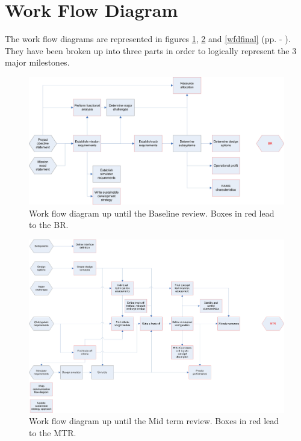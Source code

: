 \section{Work Flow Diagram}
\label{dsePPWFD}
The work flow diagrams are represented in figures \ref{wfdbase}, \ref{wfdmid} and \ref{wfdfinal} (pp. \pageref{wfdbase} - \pageref{wfdfinal}). They have been broken up into three parts in order to logically represent the 3 major milestones.

\begin{figure}[H]
\begin{center}
\includegraphics[width=1.2\textwidth, angle=90]{chapters/img/Workflow_diagram_BR.jpg}
\end{center}
\caption{Work flow diagram up until the Baseline review. Boxes in red lead to the BR.}
\label{wfdbase}
\end{figure}

\begin{figure}[H]
\begin{center}
\includegraphics[width=1.2\textwidth, angle=90]{chapters/img/Workflow_diagram_MTR.jpg}
\end{center}
\caption{Work flow diagram up until the Mid term review. Boxes in red lead to the MTR.}
\label{wfdmid}
\end{figure}

